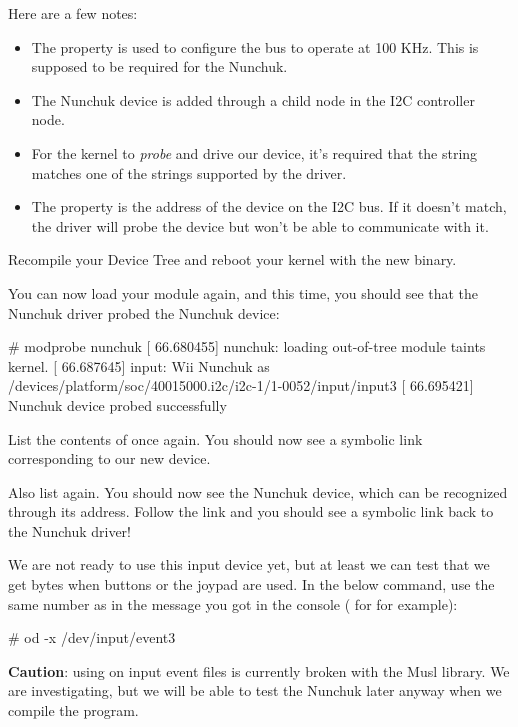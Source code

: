 {Here are a few notes:
\begin{itemize}
\item The  property is used to configure the bus
      to operate at 100 KHz. This is supposed to be required for the
      Nunchuk.
\item The Nunchuk device is added through a child node in the I2C
      controller node.
\item For the kernel to {\em probe} and drive our device, it's required
      that the  string matches one of the
       strings supported by the driver.
\item The  property is the address of the device on the
      I2C bus. If it doesn't match, the driver will probe the device
      but won't be able to communicate with it.
\end{itemize}

Recompile your Device Tree and reboot your kernel with the new binary.

You can now load your module again, and this time, you should see that
the Nunchuk driver probed the Nunchuk device:

\begin{bashinput}
# modprobe nunchuk
[   66.680455] nunchuk: loading out-of-tree module taints kernel.
[   66.687645] input: Wii Nunchuk as /devices/platform/soc/40015000.i2c/i2c-1/1-0052/input/input3
[   66.695421] Nunchuk device probed successfully
\end{bashinput}

List the contents of  once again. You
should now see a symbolic link corresponding to our new device.

Also list  again. You should now see the
Nunchuk device, which can be recognized through its  address.
Follow the link and you should see a symbolic link back to the Nunchuk
driver!

We are not ready to use this input device yet, but at least we can test
that we get bytes when buttons or the joypad are used. In the below
command, use the same number as in the message you got in the console
( for  for example):

\begin{bashinput}
# od -x /dev/input/event3
\end{bashinput}

{\bf Caution}: using  on input event files is currently broken
with the Musl library. We are investigating, but we will be able
to test the Nunchuk later anyway when we compile the 
program.

}
